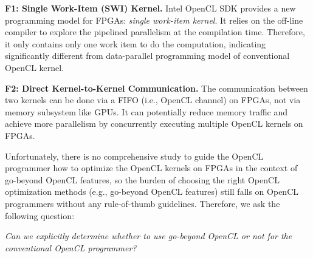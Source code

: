 \vspace{0.3em}
\noindent
{\bf F1: Single Work-Item (SWI) Kernel. }Intel OpenCL SDK provides a new programming model for FPGAs: \emph{single work-item kernel}. It relies on the off-line compiler to explore the pipelined parallelism at the compilation time. Therefore, it only contains only one work item to do the computation, indicating significantly different from data-parallel programming model of conventional OpenCL kernel. %

\vspace{0.3em}
\noindent
{\bf F2: Direct Kernel-to-Kernel Communication. }The communication between two kernels can be done via a FIFO (i.e., OpenCL channel) on FPGAs, not via memory subsystem like GPUs. It can potentially reduce memory traffic and achieve more parallelism by concurrently executing multiple OpenCL kernels on FPGAs. 
\vspace{0.3em}

Unfortunately, there is no comprehensive study to guide the OpenCL programmer how to optimize the OpenCL kernels on FPGAs in the context of go-beyond OpenCL features, so the burden of choosing the right OpenCL optimization methods (e.g., go-beyond OpenCL features) still falls on OpenCL programmers without any rule-of-thumb guidelines. %
Therefore, we ask the following question: 

\vspace{0.4em}
{\em Can we explicitly determine whether to use go-beyond OpenCL or not for the conventional OpenCL programmer?}
\vspace{0.4em}

